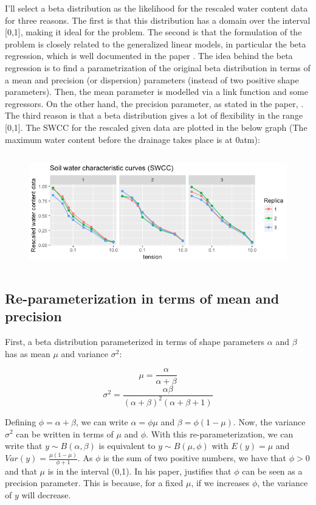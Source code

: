\documentclass{article}
\begin{document}
I'll select a beta distribution as the likelihood for the rescaled water content data for three reasons. The first is that this distribution has a domain over the interval [0,1], making it ideal for the problem. The second is that the formulation of the problem is closely related to the generalized linear models, in particular the beta regression, which is well documented in the paper \cite{cribari2009beta}. The idea behind the beta regression is to find a parametrization of the original beta distribution in terms of a mean and precision (or dispersion) parameters (instead of two positive shape parameters). Then, the mean parameter is modelled via a link function and some regressors. On the other hand, the precision parameter, as stated in the paper, . The third reason is that a beta distribution gives a lot of flexibility in the range [0,1]. The SWCC for the rescaled given data are plotted in the below graph (The maximum water content before the drainage takes place is at 0atm):
\begin{figure}[ht!]
\centering
\includegraphics[width=16cm, height=5cm]{p1.png}
\end{figure}

\subsection*{Re-parameterization in terms of mean and precision}

First, a beta distribution parameterized in terms of shape parameters $\alpha$ and $\beta$ has as mean $\mu$ and variance $\sigma^2$:


$$\mu = \frac{\alpha}{\alpha+\beta}$$ 
$$\sigma^2 = \frac{\alpha \beta}{(\alpha+\beta)^2 (\alpha + \beta +1)}$$

Defining $\phi = \alpha + \beta$, we can write $\alpha = \phi \mu$ and $\beta = \phi (1-\mu)$. Now, the variance $\sigma^2$ can be written in terms of $\mu$ and $\phi$. With this re-parameterization, we can write that $y \sim B(\alpha, \beta)$ is equivalent to $y \sim B(\mu, \phi)$ with $E(y) = \mu$ and $Var(y) =\frac{\mu (1-\mu)}{\phi +1}$. As $\phi$ is the sum of two positive numbers, we have that $\phi > 0$ and that $\mu$ is in the interval (0,1). In his paper, \cite{cribari2009beta} justifies that $\phi$ can be seen as a precision parameter. This is because, for a fixed $\mu$, if we increases $\phi$, the variance of $y$ will decrease.
\end{document}
